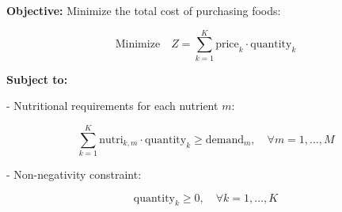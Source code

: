\documentclass{article}
\begin{document}
\textbf{Objective:} Minimize the total cost of purchasing foods:

\[
\text{Minimize} \quad Z = \sum_{k=1}^{K} \text{price}_k \cdot \text{quantity}_k
\]

\textbf{Subject to:}

- Nutritional requirements for each nutrient \( m \):

\[
\sum_{k=1}^{K} \text{nutri}_{k, m} \cdot \text{quantity}_k \geq \text{demand}_m, \quad \forall m = 1, \ldots, M
\]

- Non-negativity constraint:

\[
\text{quantity}_k \geq 0, \quad \forall k = 1, \ldots, K
\]
\end{document}
